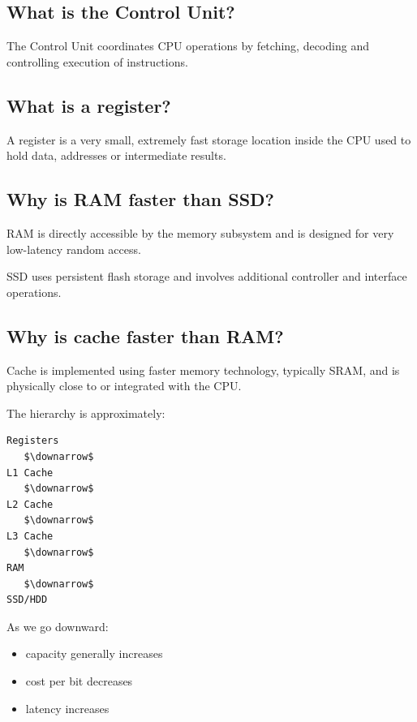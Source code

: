 \medskip

\subsection{What is the Control Unit?}

The Control Unit coordinates CPU operations by fetching, decoding and controlling execution of instructions.

\medskip

\subsection{What is a register?}

A register is a very small, extremely fast storage location inside the CPU used to hold data, addresses or intermediate results.

\medskip

\subsection{Why is RAM faster than SSD?}

RAM is directly accessible by the memory subsystem and is designed for very low-latency random access.

SSD uses persistent flash storage and involves additional controller and interface operations.

\medskip

\subsection{Why is cache faster than RAM?}

Cache is implemented using faster memory technology, typically SRAM, and is physically close to or integrated with the CPU.

The hierarchy is approximately:

\begin{lstlisting}
Registers
   $\downarrow$
L1 Cache
   $\downarrow$
L2 Cache
   $\downarrow$
L3 Cache
   $\downarrow$
RAM
   $\downarrow$
SSD/HDD
\end{lstlisting}

As we go downward:

\begin{itemize}
  \item capacity generally increases
  \item cost per bit decreases
  \item latency increases
\end{itemize}

